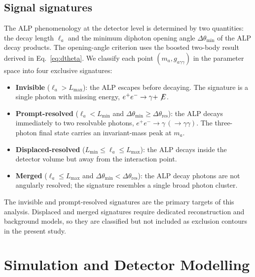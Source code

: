 \documentclass[12pt,a4paper]{article}
\newcommand{\alp}{a}
\newcommand{\gagg}{g_{a\gamma\gamma}}
\newcommand{\ma}{m_a}
\begin{document}
\subsection{Signal signatures}

The ALP phenomenology at the detector level is determined by two quantities:
the decay length $\ell_\alp$ and the minimum diphoton opening angle
$\Delta\theta_\mathrm{min}$ of the ALP decay products.
The opening-angle criterion uses the boosted two-body result derived in
Eq.~\eqref{eq:dtheta}.
We classify each point $(m_\alp, \gagg)$ in the parameter space into four
exclusive signatures:

\begin{itemize}
    \item \textbf{Invisible} ($\ell_\alp > L_\mathrm{max}$):
    the ALP escapes before decaying. The signature is a single photon with
    missing energy, $e^+e^-\to\gamma + \not\!E$.

    \item \textbf{Prompt-resolved} ($\ell_\alp < L_\mathrm{min}$ and
    $\Delta\theta_\mathrm{min} \geq \Delta\theta_\mathrm{res}$):
    the ALP decays immediately to two resolvable photons,
    $e^+e^-\to\gamma\,(\to\gamma\gamma)$. The three-photon final state
    carries an invariant-mass peak at $\ma$.

    \item \textbf{Displaced-resolved} ($L_\mathrm{min} \leq \ell_\alp \leq L_\mathrm{max}$):
    the ALP decays inside the detector volume but away from the interaction point.

    \item \textbf{Merged} ($\ell_\alp \leq L_\mathrm{max}$ and
    $\Delta\theta_\mathrm{min} < \Delta\theta_\mathrm{res}$):
    the ALP decay photons are not angularly resolved; the signature resembles a
    single broad photon cluster.
\end{itemize}

The invisible and prompt-resolved signatures are the primary targets of this
analysis. Displaced and merged signatures require dedicated reconstruction and
background models, so they are classified but not included as exclusion
contours in the present study.

\section{Simulation and Detector Modelling}
\label{sec:simulation}
\end{document}
